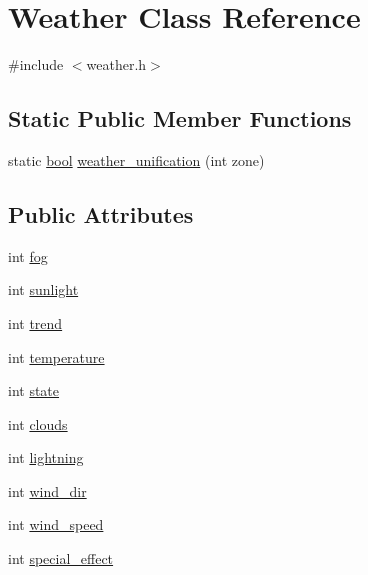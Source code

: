\hypertarget{classWeather}{\section{Weather Class Reference}
\label{classWeather}
}


{\ttfamily \#include $<$weather.\-h$>$}

\subsection*{Static Public Member Functions}
\begin{DoxyCompactItemize}
\item 
static \hyperlink{structs_8h_ad5c9d4ba3dc37783a528b0925dc981a0}{bool} \hyperlink{classWeather_ae86a7b871374468ff713e5dd2860438a}{weather\-\_\-unification} (int zone)
\end{DoxyCompactItemize}
\subsection*{Public Attributes}
\begin{DoxyCompactItemize}
\item 
int \hyperlink{classWeather_a01aefe5b420d80cfad47e9f284d79626}{fog}
\item 
int \hyperlink{classWeather_ab40997fa4f5013a26576cd73f9e8befa}{sunlight}
\item 
int \hyperlink{classWeather_aa35eac1fe8923f53dd13deec24b316c4}{trend}
\item 
int \hyperlink{classWeather_a9c591d262445fa81b2db1ed42c10243b}{temperature}
\item 
int \hyperlink{classWeather_a4c7ab25a82283c8c7a2b3b952f2b3774}{state}
\item 
int \hyperlink{classWeather_a9f547babbc20e54f3b2867b90588b5e4}{clouds}
\item 
int \hyperlink{classWeather_a2e6daf8e8ebd008546e41d16899b38fc}{lightning}
\item 
int \hyperlink{classWeather_a6954a350137a1f71caf7a497a9151268}{wind\-\_\-dir}
\item 
int \hyperlink{classWeather_a52ed27651f257fccf8781875231bdb6e}{wind\-\_\-speed}
\item 
int \hyperlink{classWeather_aaf92329f8976174333b59190d6f7d394}{special\-\_\-effect}
\end{DoxyCompactItemize}



